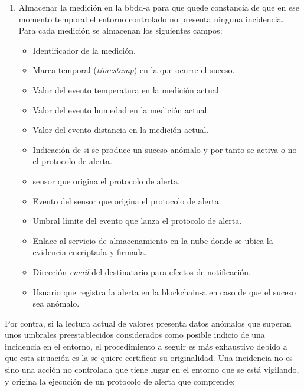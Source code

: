 \documentclass[12pt,a4paper, twoside]{report}
\begin{document}
	\begin{enumerate}
		\item Almacenar la medición en la \gls{bbdd-a} para que quede constancia de que en ese momento temporal el entorno controlado no presenta ninguna incidencia. Para cada medición se almacenan los siguientes campos:
		
			\begin{itemize}
				\item Identificador de la medición.
				\item Marca temporal (\textit{timestamp}) en la que ocurre el suceso.
				\item Valor del evento temperatura en la medición actual.
				\item Valor del evento humedad en la medición actual.
				\item Valor del evento distancia en la medición actual.
				\item Indicación de si se produce un suceso anómalo y por tanto se activa o no el protocolo de alerta.
				\item \Gls{sensor} que origina el protocolo de alerta.
				\item Evento del \gls{sensor} que origina el protocolo de alerta.
				\item Umbral límite del evento que lanza el protocolo de alerta.
				\item Enlace al servicio de almacenamiento en la nube donde se ubica la evidencia encriptada y firmada.
				\item Dirección \textit{email} del destinatario para efectos de notificación.
				\item Usuario que registra la alerta en la \gls{blockchain-a} en caso de que el suceso sea anómalo.
			\end{itemize}
	\end{enumerate}
		
	Por contra, si la lectura actual de valores presenta datos anómalos que superan unos umbrales preestablecidos considerados como posible indicio de una incidencia en el entorno, el procedimiento a seguir es más exhaustivo debido a que esta situación es la se quiere certificar su originalidad. Una incidencia no es sino una acción no controlada que tiene lugar en el entorno que se está vigilando, y origina la ejecución de un protocolo de alerta que comprende:
		
\end{document}
